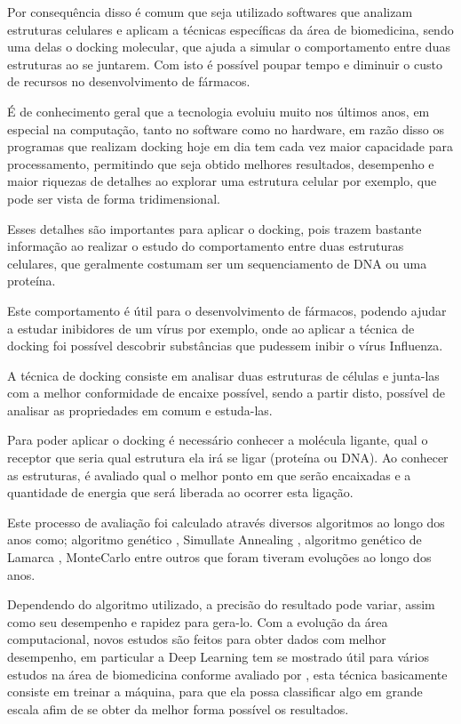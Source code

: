 \documentclass[tcc, capa]{texucpel}
\begin{document}
Por consequência disso é comum que seja utilizado softwares que analizam estruturas celulares e aplicam a técnicas específicas da área de biomedicina, sendo uma delas o docking molecular, que ajuda a simular o comportamento entre duas estruturas ao se juntarem.
Com isto é possível poupar tempo e diminuir o custo de recursos no desenvolvimento de fármacos.

É de conhecimento geral que a tecnologia evoluiu muito nos últimos anos, em especial na computação, tanto no software como no hardware,  em razão disso os programas que realizam docking hoje em dia tem cada vez maior capacidade para processamento, permitindo que seja obtido melhores resultados, desempenho e maior riquezas de detalhes ao explorar uma estrutura celular por exemplo, que pode ser vista de forma tridimensional.

Esses detalhes são importantes para aplicar o docking, pois trazem bastante informação ao realizar o estudo do comportamento entre duas estruturas celulares, que geralmente costumam ser um sequenciamento de DNA ou uma proteína.%

Este comportamento é útil para o desenvolvimento de fármacos, podendo ajudar a estudar inibidores de um vírus por exemplo,  onde ao aplicar a técnica de docking foi possível descobrir substâncias que pudessem inibir o vírus Influenza\cite{ishikawa2011binding}.

A técnica de docking consiste em analisar duas estruturas de células e junta-las com a melhor conformidade de encaixe possível, sendo a partir disto, possível de analisar as propriedades em comum e estuda-las.

Para poder aplicar o docking é necessário conhecer a molécula ligante, qual o receptor que seria qual estrutura ela irá se ligar (proteína ou DNA). Ao conhecer as estruturas, é avaliado qual o melhor ponto em que serão encaixadas e a quantidade de energia que será liberada ao ocorrer esta ligação.

Este processo de avaliação foi calculado através diversos algoritmos ao longo dos anos como; algoritmo genético \cite{holland1975adaptation},  Simullate Annealing \cite{kirkpatrick1984optimization} ,  algoritmo genético de Lamarca \cite{morris1998automated},  MonteCarlo \cite{caflisch1992monte} entre outros que foram tiveram evoluções ao longo dos anos. 

Dependendo do algoritmo utilizado, a precisão do resultado pode variar, assim como seu desempenho e rapidez para gera-lo.
Com a evolução da área computacional, novos estudos são feitos para obter dados com melhor desempenho, em particular a Deep Learning tem se mostrado útil para vários estudos na área de biomedicina conforme avaliado por \cite{korotcov2017comparison,mamoshina2016applications}
, esta técnica basicamente consiste em treinar a máquina, para que ela possa classificar algo em grande escala afim de se obter da melhor forma possível  os resultados.
\end{document}
